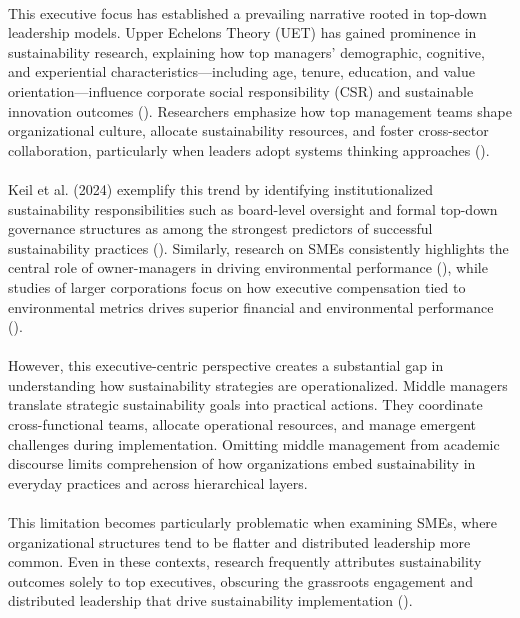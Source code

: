 	\paragraph*{} This executive focus has established a prevailing narrative rooted in top-down leadership models. Upper Echelons Theory (UET) has gained prominence in sustainability research, explaining how top managers’ demographic, cognitive, and experiential characteristics—including age, tenure, education, and value orientation—influence corporate social responsibility (CSR) and sustainable innovation outcomes (\textcite{Waldman2008, Ioannou2015}). Researchers emphasize how top management teams shape organizational culture, allocate sustainability resources, and foster cross-sector collaboration, particularly when leaders adopt systems thinking approaches (\textcite{Dyllick2016}).
	
	\paragraph*{} Keil et al. (2024) exemplify this trend by identifying institutionalized sustainability responsibilities such as board-level oversight and formal top-down governance structures as among the strongest predictors of successful sustainability practices (\textcite{keil2024c}). Similarly, research on SMEs consistently highlights the central role of owner-managers in driving environmental performance (\textcite{kutzschbach2021c}), while studies of larger corporations focus on how executive compensation tied to environmental metrics drives superior financial and environmental performance (\textcite{Eccles2014}).
	
	\paragraph*{} However, this executive-centric perspective creates a substantial gap in understanding how sustainability strategies are operationalized. Middle managers translate strategic sustainability goals into practical actions. They coordinate cross-functional teams, allocate operational resources, and manage emergent challenges during implementation. Omitting middle management from academic discourse limits comprehension of how organizations embed sustainability in everyday practices and across hierarchical layers.
	
	\paragraph*{} This limitation becomes particularly problematic when examining SMEs, where organizational structures tend to be flatter and distributed leadership more common. Even in these contexts, research frequently attributes sustainability outcomes solely to top executives, obscuring the grassroots engagement and distributed leadership that drive sustainability implementation (\textcite{birkinshaw2010}).
	
